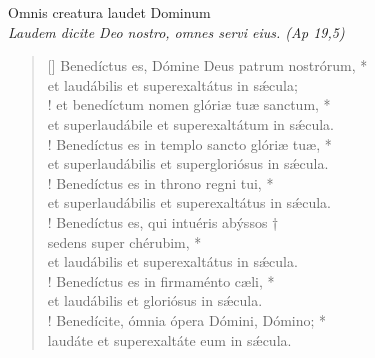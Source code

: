 \def\greinitialformat#1{{\fontsize{40}{40}\selectfont #1}}
\gresetfirstlineaboveinitial{\small \textcolor{red}{ 2. Ant.}}{}
\setaboveinitialseparation{0.72mm}
\vspace{0.3cm}
\begin{center}
 
Omnis creatura laudet Dominum\\
\textit{\small Laudem dicite Deo nostro, omnes servi eius. (Ap 19,5)}
\end{center}
\begin{verse}[\versewidth]
Benedíctus es, Dómine Deus patrum nostrórum, *\\
et laudábilis et superexaltátus in s\'{æ}cula;\\!
\vin et benedíctum nomen glóriæ tuæ sanctum, *\\
\vin et superlaudábile et superexaltátum in s\'{æ}cula.\\!
Benedíctus es in templo sancto glóriæ tuæ, *\\
et superlaudábilis et supergloriósus in s\'{æ}cula.\\!
\vin Benedíctus es in throno regni tui, *\\
\vin et superlaudábilis et superexaltátus in s\'{æ}cula.\\!
Benedíctus es, qui intuéris abýssos †\\
sedens super chérubim, *\\
et laudábilis et superexaltátus in s\'{æ}cula.\\!
\vin Benedíctus es in firmaménto cæli, *\\
\vin et laudábilis et gloriósus in s\'{æ}cula.\\!
Benedícite, ómnia ópera Dómini, Dómino; *\\
laudáte et superexaltáte eum in s\'{æ}cula.\\
\end{verse}
\vspace{1cm}


